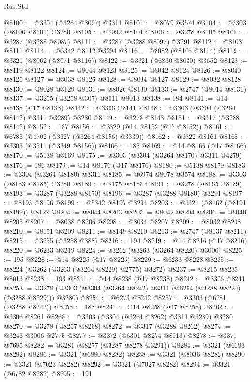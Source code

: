\begin{lexlean}{RustStd}
\begin{coremodule}
{\begin{coremodule}
{{{{{{{{{{{{{{{{{{{{{{{{{{{{{{{{{@8100 := @3304 (@3264 @8097) @3311
@8101 := @8079 @3574
@8104 := @3303 (@8100 @8101) @3280
@8105 := @8092 @8104
@8106 := @3278 @8105
@8108 := @3287 (@3288 @8087)
@8111 := @3287 (@3288 @8097) @3291
@8112 := @8108 @8111
@8114 := @5342 @8112 @3294
@8116 := @8082 (@8106 @8114)
@8119 := @3321 (@8062 (@8071 @8116))
@8122 := @3321 (@6830 @8030) @3652
@8123 := @8119 @8122
@8124 := @8044 @8123
@8125 := @8042 @8124
@8126 := @8040 @8125
@8127 := @8038 @8126
@8128 := @8034 @8127
@8129 := @8032 @8128
@8130 := @8028 @8129
@8131 := @8026 @8130
@8133 := @2747 (@8014 @8131)
@8137 := @3255 (@3258 @307) @8011 @8013
@8138 := 184
@8141 := @14 @8138 (@17 @8138)
@8142 := @3306 @8141
@8148 := @3303 (@3304 (@3264 @8142) @3311 @3289) @3280
@8149 := @3278 @8148
@8151 := @3317 (@3288 @8142)
@8152 := 187
@8156 := @3329 (@14 @8152 (@17 @8152))
@8161 := @6785 (@4702 (@3327 (@3264 @8156) @3339))
@8162 := @3322 @8161
@8165 := @3303 (@3511 (@3349 @8156))
@8166 := 185
@8169 := @14 @8166 (@17 @8166)
@8170 := @5138 @8169
@8175 := @3303 (@3304 (@3264 @8170) @3311 @4279)
@8176 := 186
@8179 := @14 @8176 (@17 @8176)
@8180 := @5138 @8179
@8183 := @3304 (@3264 @8180) @3311
@8185 := @6974 @8078 @3574
@8188 := @3303 (@8183 @8185) @3280
@8189 := @8175 @8188
@8191 := @3278 (@8165 @8189)
@8193 := @3287 (@3288 @8170)
@8196 := @3287 (@3288 @8180) @3291
@8197 := @8193 @8196
@8199 := @5342 @8197 @3294
@8203 := @3321 (@8162 (@8191 @8199)) @8122
@8204 := @8044 @8203
@8205 := @8042 @8204
@8206 := @8040 @8205
@8207 := @8038 @8206
@8208 := @8034 @8207
@8209 := @8032 @8208
@8210 := @8151 @8209
@8211 := @8149 @8210
@8213 := @2747 (@8137 @8211)
@8215 := @3255 (@3258 @388)
@8216 := 194
@8219 := @14 @8216 (@17 @8216)
@8220 := @6233 @8219
@8224 := @3262 (@3263 (@3264 @8220) @3006)
@8225 := 195
@8228 := @14 @8225 (@17 @8225)
@8229 := @6233 @8228
@8235 := @8224 (@3262 (@3263 (@3264 @8229) @2775) @3272)
@8237 := @8215 @8235 @8013
@8238 := 193
@8241 := @14 @8238 (@17 @8238)
@8242 := @3306 @8241
@8253 := @3278 (@3303 (@3304 (@3264 @8242) @3311 (@6264 (@3288 @8220) (@3288 @8229))) @3280)
@8254 := @6273 @8242
@8257 := @3303 (@6281 (@3288 @8242))
@8258 := 188
@8261 := @14 @8258 (@17 @8258)
@8262 := @3306 @8261
@8268 := @3303 (@3304 (@3264 @8262) @3311 @3289) @3280
@8270 := @3278 (@8257 @8268)
@8272 := @3317 (@3288 @8262)
@8274 := @3243 @3006 @2775
@8277 := @3372 (@6301 @8274 @8013)
@8278 := @3371 @7685
@8282 := @3281 (@8277 (@3287 @8278 @3291))
@8284 := @3321 (@6683 @8282)
@8286 := @3321 (@6880 @8282)
@8288 := @3321 (@8036 @8282)
@8290 := @3321 (@7023 @8282)
@8292 := @3321 (@7027 @8282)
@8294 := @3321 (@6782 @8282)
@8295 := 191
}}}}}}}}}}}}}}}}}}}}}}}}}}}}}}}}}
\end{coremodule}}
\end{coremodule}
\end{lexlean}
